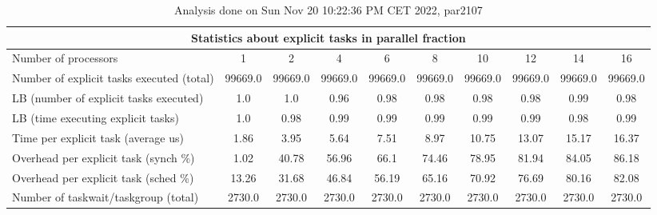 \begin{table}[h]
\begin{center}
\begin{tabular}{|l|c|c|c|c|c|c|c|c|c|}
\hline
\multicolumn{10}{|c|}{Statistics about explicit tasks in parallel fraction} \\
\hline
\hline
Number of processors & 1 & 2 & 4 & 6 & 8 & 10 & 12 & 14 & 16 \\
\hline
\hline
Number of explicit tasks executed (total)        &         99669.0 &         99669.0 &         99669.0 &         99669.0 &         99669.0 &         99669.0 &         99669.0 &         99669.0 &         99669.0 \\
\hline
LB (number of explicit tasks executed)           &             1.0 &             1.0 &            0.96 &            0.98 &            0.98 &            0.98 &            0.98 &            0.99 &            0.98 \\
\hline
LB (time executing explicit tasks)               &             1.0 &            0.98 &            0.99 &            0.99 &            0.99 &            0.99 &            0.99 &            0.98 &            0.99 \\
\hline
Time per explicit task (average us)                 &            1.86 &            3.95 &            5.64 &            7.51 &            8.97 &           10.75 &           13.07 &           15.17 &           16.37 \\
\hline
Overhead per explicit task (synch \%)             &            1.02 &           40.78 &           56.96 &            66.1 &           74.46 &           78.95 &           81.94 &           84.05 &           86.18 \\
\hline
Overhead per explicit task (sched \%)             &           13.26 &           31.68 &           46.84 &           56.19 &           65.16 &           70.92 &           76.69 &           80.16 &           82.08 \\
\hline
Number of taskwait/taskgroup (total)             &          2730.0 &          2730.0 &          2730.0 &          2730.0 &          2730.0 &          2730.0 &          2730.0 &          2730.0 &          2730.0 \\
\hline
\end{tabular}
\end{center}
\caption{ Analysis done on Sun Nov 20 10:22:36 PM CET 2022, par2107}
\end{table}

